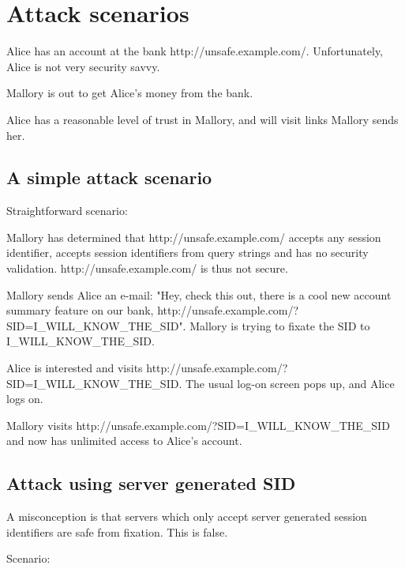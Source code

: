 \section{Attack scenarios}


Alice has an account at the bank http://unsafe.example.com/. Unfortunately, Alice is not very security savvy.

Mallory is out to get Alice's money from the bank.

Alice has a reasonable level of trust in Mallory, and will visit links Mallory sends her.



\subsection{A simple attack scenario}

Straightforward scenario:

\begin{compactenum}
\item Mallory has determined that http://unsafe.example.com/ accepts any session identifier, accepts session identifiers from query strings and has no security validation. http://unsafe.example.com/ is thus not secure.
\item Mallory sends Alice an e-mail: "Hey, check this out, there is a cool new account summary feature on our bank, http://unsafe.example.com/?SID=I\_WILL\_KNOW\_THE\_SID". Mallory is trying to fixate the SID to I\_WILL\_KNOW\_THE\_SID.
\item Alice is interested and visits http://unsafe.example.com/?SID=I\_WILL\_KNOW\_THE\_SID. The usual log-on screen pops up, and Alice logs on.
\item Mallory visits http://unsafe.example.com/?SID=I\_WILL\_KNOW\_THE\_SID and now has unlimited access to Alice's account.
\end{compactenum}







\subsection{Attack using server generated SID}

A misconception is that servers which only accept server generated session identifiers are safe from fixation. This is false.

Scenario:

